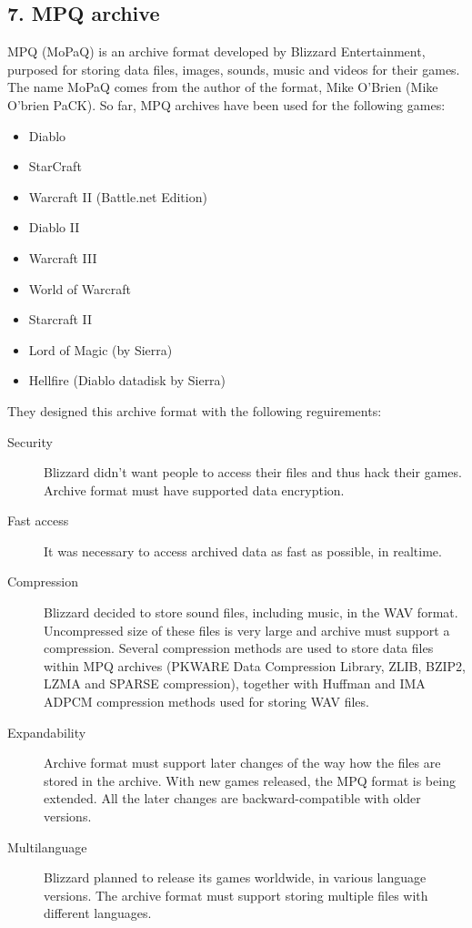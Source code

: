 \documentclass[letterpaper]{article}
\begin{document}
\subsection{7. MPQ archive}
MPQ (MoPaQ) is an archive format developed by Blizzard Entertainment, purposed for storing data files, images, sounds, music and videos for their games. The name MoPaQ comes from the author of the format, Mike O'Brien (Mike O'brien PaCK). So far, MPQ archives have been used for the following games:
\begin{itemize}
	\item Diablo
	\item StarCraft
	\item Warcraft II (Battle.net Edition)
	\item Diablo II
	\item Warcraft III
	\item World of Warcraft
	\item Starcraft II
	\item Lord of Magic (by Sierra)
	\item Hellfire (Diablo datadisk by Sierra)
\end{itemize}

They designed this archive format with the following reguirements:
\begin{description}
	\item[Security] Blizzard didn't want people to access their files and thus hack their games. Archive format must have supported data encryption.
	\item[Fast access] It was necessary to access archived data as fast as possible, in realtime.
	\item[Compression] Blizzard decided to store sound files, including music, in the WAV format. Uncompressed size of these files is very large and archive must support a compression. Several compression methods are used to store data files within MPQ archives (PKWARE Data Compression Library, ZLIB, BZIP2, LZMA and SPARSE compression), together with Huffman and IMA ADPCM compression methods used for storing WAV files.
	\item[Expandability] Archive format must support later changes of the way how the files are stored in the archive. With new games released, the MPQ format is being extended. All the later changes are backward-compatible with older versions.
	\item[Multilanguage] Blizzard planned to release its games worldwide, in various language versions. The archive format must support storing multiple files with different languages.
\end{description}
\end{document}
